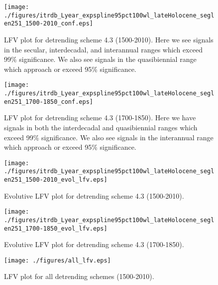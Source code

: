 \documentclass[phd,tocprelim]{cornell}
\begin{document}
\begin{figure}[!tbp]
\centering
\begin{minipage}[b]{0.45\textwidth}
\texttt{[image: ./figures/itrdb\_Lyear\_expspline95pct100wl\_lateHolocene\_seglen251\_1500-2010\_conf.eps]}
\caption{LFV plot for detrending scheme 4.3 (1500-2010). Here we see signals in the secular, interdecadal, and interannual ranges which exceed 99\% significance. We also see signals in the quasibiennial range which approach or exceed 95\% significance.}
\label{conf4.3:1500}
\end{minipage}
\hfill
\begin{minipage}[b]{0.45\textwidth}
\texttt{[image: ./figures/itrdb\_Lyear\_expspline95pct100wl\_lateHolocene\_seglen251\_1700-1850\_conf.eps]}
\caption{LFV plot for detrending scheme 4.3 (1700-1850). Here we have signals in both the interdecadal and quasibiennial ranges which exceed 99\% significance. We also see signals in the interannual range which approach or exceed 95\% significance.}
\label{conf4.3:1700}
\end{minipage}
\end{figure}

\begin{figure}[!tbp]
\centering
\begin{minipage}[b]{0.45\textwidth}
\texttt{[image: ./figures/itrdb\_Lyear\_expspline95pct100wl\_lateHolocene\_seglen251\_1500-2010\_evol\_lfv.eps]}

\caption{Evolutive LFV plot for detrending scheme 4.3 (1500-2010).}
\label{evol4.3:1500}

\end{minipage}
\hfill
\begin{minipage}[b]{0.45\textwidth}
\texttt{[image: ./figures/itrdb\_Lyear\_expspline95pct100wl\_lateHolocene\_seglen251\_1700-1850\_evol\_lfv.eps]}
\caption{Evolutive LFV plot for detrending scheme 4.3 (1700-1850).}
\label{evol4.3:1700}
\end{minipage}
\end{figure}

\begin{figure}[!tbp]
\centering
\texttt{[image: ./figures/all\_lfv.eps]}
\caption{LFV plot for all detrending schemes (1500-2010).}
\label{lfv:all:1500}
\end{figure}

\clearpage
\newpage
\end{document}
